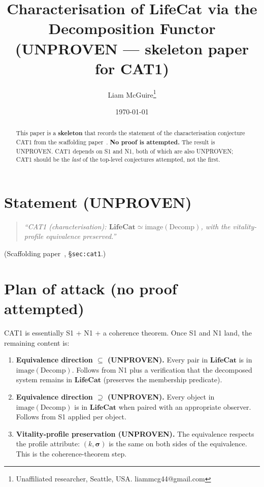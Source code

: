 \documentclass[11pt]{article}
\title{Characterisation of $\mathbf{LifeCat}$ via the Decomposition Functor \\
       \large (UNPROVEN --- skeleton paper for CAT1)}
\author{Liam McGuire\thanks{Unaffiliated researcher, Seattle, USA. liammcg44@gmail.com}}
\date{\today}
\theoremstyle{plain}
\theoremstyle{definition}
\begin{document}
\maketitle

\begin{abstract}
This paper is a \textbf{skeleton} that records the statement of the
characterisation conjecture CAT1 from the scaffolding
paper~\cite{emergent_systems_2026}. \textbf{No proof is attempted.}
The result is UNPROVEN. CAT1 depends on S1 and N1, both of which are
also UNPROVEN; CAT1 should be the \emph{last} of the top-level
conjectures attempted, not the first.
\end{abstract}

\section{Statement (UNPROVEN)}

\begin{quote}
\emph{``CAT1 (characterisation): $\mathbf{LifeCat} \simeq
\mathrm{image}(\mathrm{Decomp})$, with the vitality-profile equivalence
preserved.''}
\end{quote}
\noindent (Scaffolding paper~\cite{emergent_systems_2026},
\S\texttt{sec:cat1}.)

\section{Plan of attack (no proof attempted)}

CAT1 is essentially S1 + N1 + a coherence theorem. Once S1 and N1
land, the remaining content is:

\begin{enumerate}[leftmargin=2em,itemsep=4pt]
  \item \textbf{Equivalence direction $\subseteq$ (UNPROVEN).} Every
    pair in $\mathbf{LifeCat}$ is in $\mathrm{image}(\mathrm{Decomp})$.
    Follows from N1 plus a verification that the decomposed system
    remains in $\mathbf{LifeCat}$ (preserves the membership predicate).
  \item \textbf{Equivalence direction $\supseteq$ (UNPROVEN).} Every
    object in $\mathrm{image}(\mathrm{Decomp})$ is in
    $\mathbf{LifeCat}$ when paired with an appropriate observer.
    Follows from S1 applied per object.
  \item \textbf{Vitality-profile preservation (UNPROVEN).} The
    equivalence respects the profile attribute: $(k, \boldsymbol{\sigma})$
    is the same on both sides of the equivalence. This is the
    coherence-theorem step.
\end{enumerate}
\end{document}
